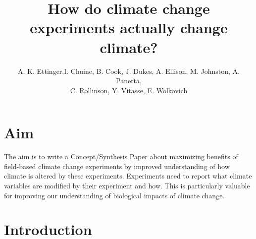\documentclass{article}
\begin{document}
% 
\title{How do climate change experiments actually change climate?} %
\author{A. K. Ettinger,I. Chuine, B. Cook, J. Dukes, A. Ellison, M. Johnston, A. Panetta,\\ C. Rollinson, Y. Vitasse, E. Wolkovich}
\maketitle  %

\section {Aim}

The aim is to write a Concept/Synthesis Paper about maximizing benefits of field-based climate change experiments by improved understanding of how climate is altered by these experiments. Experiments need to report what climate variables are modified by their experiment and how. %
This is particularly valuable for improving our understanding of biological impacts of climate change.


\section {Introduction}
\end{document}

